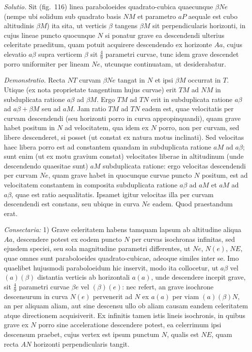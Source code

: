 \documentclass{article}
\begin{document}
\emph{Solutio.} Sit (fig.~116) linea paraboloeides quadrato-cubica quaecunque $\beta Ne$ (nempe ubi
solidum sub quadrato basis $NM$ et parametro $aP$ aequale est cubo altitudinis $\beta M$) ita sita,
ut verticis $\beta$ tangens $\beta M$ sit perpendicularis horizonti, in cujus lineae puncto
quocunque $N$ si ponatur grave ea descendendi ulterius celeritate praeditum, quam potuit acquirere
descendendo ex horizonte $Aa$, cujus elevatio $a\beta$ supra verticem $\beta$ sit
$\frac{4}{9}$ parametri curvae, tunc idem grave descendet porro uniformiter per lineam $Ne$,
utcunque continuatam, ut desiderabatur.

\emph{Demonstratio.} Recta $NT$ curvam $\beta Ne$ tangat in $N$ et ipsi $\beta M$ occurrat in $T$.
Utique (ex nota proprietate tangentium hujus curvae) erit $TM$ ad $NM$ in subduplicata ratione
$a\beta$ ad $\beta M$. Ergo $TM$ ad $TN$ erit in subduplicata ratione $a\beta$ ad
$a\beta + \beta M$ seu ad $aM$. Jam ratio $TM$ ad $TN$ eadem est, quae velocitatis per curvam
descendendi (seu horizonti porro in curva appropinquandi), quam grave habet positum in $N$ ad
velocitatem, qua idem ex $N$ porro, non per curvam, sed libere descenderet, si posset (ut constat
ex natura motus inclinati). Sed velocitas haec libera porro est ad constantem quandam in
subduplicata ratione $aM$ ad $a\beta$; sunt enim (ut ex motu gravium constat) velocitates liberae
in altitudinum
(unde descendendo quaesitae sunt) $aM$ subduplicata ratione: ergo velocitas descendendi per curvam
$Ne$, quam grave habet in quocunque curvae puncto $N$ positum, est ad velocitatem constantem in
composita subduplicata ratione $a\beta$ ad $aM$ et $aM$ ad $a\beta$, quae est ratio aequalitatis.
Ipsamet igitur velocitas illa per curvam descendendi est constans, seu ubique in curva $Ne$ eadem.
Quod praestandum erat.

\emph{Consectaria:} 1) Grave celeritatem habens tamquam lapsum ab altitudine aliqua $Aa$,
descendere potest ex eodem puncto $N$ per curvas isochronas infinitas, sed ejusdem speciei, seu
sola magnitudine parametri differentes, ut $Ne$, $N(e)$, $NE$, quae omnes sunt paraboloeides
quadrato-cubicae, adeoque similes inter se. Imo quaelibet hujusmodi paraboloeidum hic inservit,
modo ita collocetur, ut $a\beta$ vel $(a)(\beta)$ distantia verticis ab horizontali $a(a)$, unde
descendere incepit grave, sit $\frac{4}{9}$ parametri curvae $\beta e$ vel $(\beta)(e)$: nec refert,
an grave isochrone descensurum in curva $N(e)$ pervenerit ad $N$ ex $a(a)$ per viam
$(a)(\beta)N$, an per aliquam aliam, aut sine descensu ullo ob aliam causam eandem celeritatem
atque directionem acquisiverit. Ex infinitis tamen istis lineis isochronis, in quibus grave ex $N$
porro sine acceleratione descendere potest, ea celerrimum ipsi descensum praebet, cujus vertex est
ipsum punctum $N$, qualis est $NE$, quam recta $AN$ horizonti perpendicularis tangit.
\end{document}

